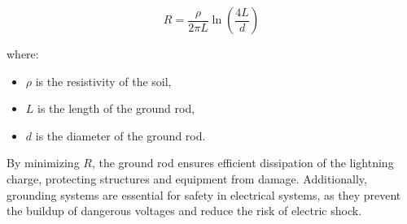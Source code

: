 \[
R = \frac{\rho}{2\pi L} \ln\left(\frac{4L}{d}\right)
\]

where:
\begin{itemize}
    \item \( \rho \) is the resistivity of the soil,
    \item \( L \) is the length of the ground rod,
    \item \( d \) is the diameter of the ground rod.
\end{itemize}

By minimizing \( R \), the ground rod ensures efficient dissipation of the lightning charge, protecting structures and equipment from damage. Additionally, grounding systems are essential for safety in electrical systems, as they prevent the buildup of dangerous voltages and reduce the risk of electric shock.


